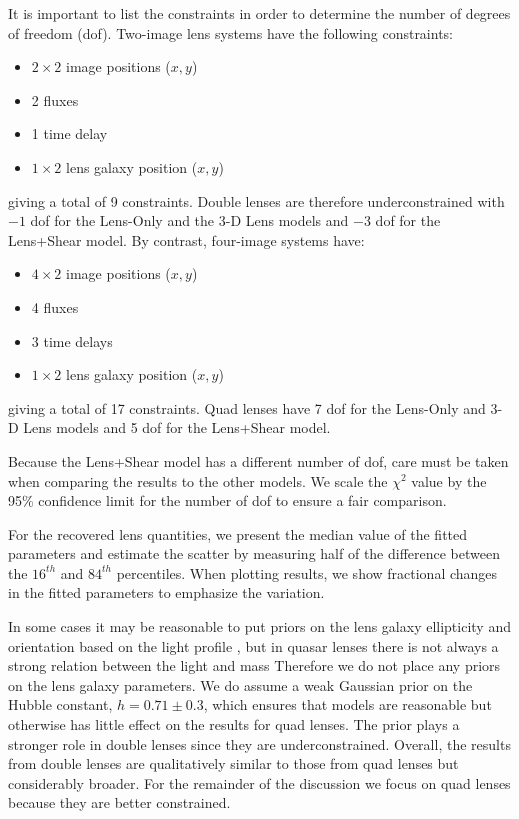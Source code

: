 \documentclass{emulateapj}
\begin{document}
It is important to list the constraints in order to determine the number of degrees of freedom (dof).  Two-image lens systems have the following constraints:
\begin{itemize}
\item $2\times 2$ image  positions ($x,y$)
\item 2 fluxes
\item 1 time delay 
\item $1\times 2$ lens galaxy position ($x,y$)
\end{itemize}
giving a total of 9 constraints. Double lenses are therefore underconstrained with $-1$ dof for the Lens-Only and the 3-D Lens models and $-3$ dof for the Lens+Shear model.
By contrast, four-image systems have:
\begin{itemize}
\item $4\times 2$ image positions ($x,y$)
\item 4 fluxes
\item 3 time delays
\item $1\times 2$ lens galaxy position ($x,y$) 
\end{itemize}
giving a total of 17 constraints.
Quad lenses have 7 dof for the Lens-Only and 3-D Lens models and 5 dof for the Lens+Shear model.

Because the Lens+Shear model has a different number of dof, care must be taken when comparing the results to the other models. We scale the $\chi^2$ value by the 95\% confidence limit for the number of dof to ensure a fair comparison.

For the recovered lens quantities, we present the median value of the fitted parameters and estimate the scatter by measuring half of the difference between the $16^{th}$ and $84^{th}$ percentiles. When plotting results, we show fractional changes in the fitted parameters to emphasize the variation.

In some cases it may be reasonable to put priors on the lens galaxy ellipticity and orientation based on the light profile \citep[e.g.,][]{Bolton08}, but in quasar lenses there is not always a strong relation between the light and mass \citep[][and references therein]{Bruderer15}  Therefore we do not place any priors on the lens galaxy parameters.  We do assume a weak Gaussian prior on the Hubble constant, $h = 0.71 \pm 0.3$, which ensures that models are reasonable but otherwise has little effect on the results for quad lenses.  The prior plays a stronger role in double lenses since they are underconstrained.  Overall, the results from double lenses are qualitatively similar to those from quad lenses but considerably broader.  For the remainder of the discussion we focus on quad lenses because they are better constrained.
\end{document}
